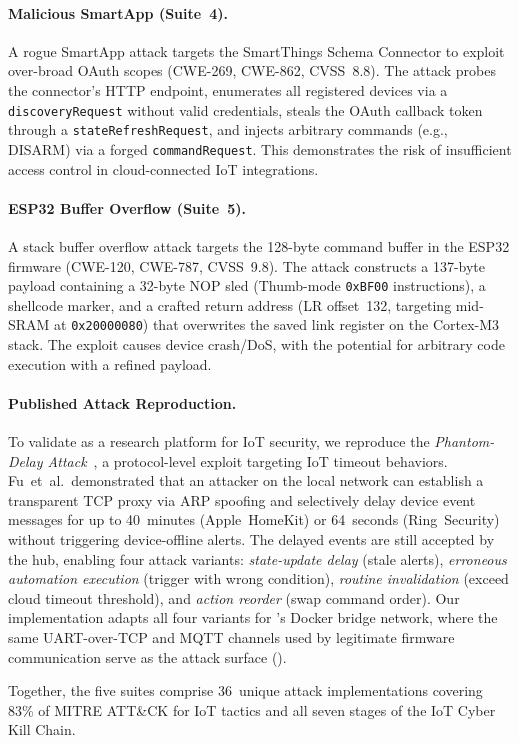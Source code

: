 \paragraph{Malicious SmartApp (Suite~4).}
A rogue SmartApp attack targets the SmartThings Schema Connector
to exploit over-broad OAuth scopes (CWE-269, CWE-862, CVSS~8.8).
The attack probes the connector's HTTP endpoint, enumerates all
registered devices via a \texttt{discoveryRequest} without valid
credentials, steals the OAuth callback token through a
\texttt{stateRefreshRequest}, and injects arbitrary commands
(e.g., DISARM) via a forged \texttt{commandRequest}.
This demonstrates the risk of insufficient access control in
cloud-connected IoT integrations.

\paragraph{ESP32 Buffer Overflow (Suite~5).}
A stack buffer overflow attack targets the 128-byte command buffer
in the ESP32 firmware (CWE-120, CWE-787, CVSS~9.8).  The attack
constructs a 137-byte payload containing a 32-byte NOP sled
(Thumb-mode \texttt{0xBF00} instructions), a shellcode marker, and
a crafted return address (LR offset~132, targeting mid-SRAM at
\texttt{0x20000080}) that overwrites the saved link register on the
Cortex-M3 stack.  The exploit causes device crash/DoS, with the
potential for arbitrary code execution with a refined payload.

\paragraph{Published Attack Reproduction.}
To validate \sys{} as a research platform for IoT security,
we reproduce the \emph{Phantom-Delay Attack}~\cite{phantom-delay},
a protocol-level exploit targeting IoT timeout behaviors.
Fu~et~al.\ demonstrated that an attacker on the local network can
establish a transparent TCP proxy via ARP spoofing and selectively
delay device event messages for up to 40~minutes (Apple~HomeKit)
or 64~seconds (Ring~Security) without triggering device-offline
alerts.  The delayed events are still accepted by the hub,
enabling four attack variants: \emph{state-update delay}
(stale alerts), \emph{erroneous automation execution}
(trigger with wrong condition), \emph{routine invalidation}
(exceed cloud timeout threshold), and \emph{action reorder}
(swap command order).  Our implementation adapts all four variants
for \sys{}'s Docker bridge network, where the same UART-over-TCP
and MQTT channels used by legitimate firmware communication serve
as the attack surface ().

Together, the five suites comprise 36~unique attack implementations
covering 83\% of MITRE ATT\&CK for IoT tactics and all seven stages
of the IoT Cyber Kill Chain.
